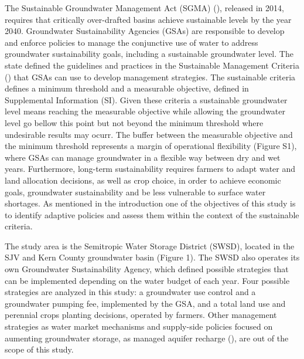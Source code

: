 \documentclass[11pt,a4paper]{article}
\begin{document}
 The Sustainable Groundwater Management Act (SGMA) (\cite{dwr_sustainable_2021}), released in 2014, requires that critically over-drafted basins achieve sustainable levels by the year 2040. Groundwater Sustainability Agencies (GSAs) are responsible to develop and enforce policies to manage the conjunctive use of water to address groundwater sustainability goals, including a sustainable groundwater level. The state defined the guidelines and practices in the Sustainable Management Criteria (\cite{dwr_sustainable_2017}) that GSAs can use to develop management strategies. The sustainable criteria defines a minimum threshold and a measurable objective, defined in Supplemental Information (SI). Given these criteria a sustainable groundwater level means reaching the measurable objective while allowing the groundwater level go bellow this point but not beyond the minimum threshold where undesirable results may ocurr. The buffer between the measurable objective and the minimum threshold represents a margin of operational flexibility (Figure S1), where GSAs can manage groundwater in a flexible way between dry and wet years. Furthermore, long-term sustainability requires farmers to adapt water and land allocation decisions, as well as crop choice, in order to achieve economic goals, groundwater sustainability and be less vulnerable to surface water shortages. As mentioned in the introduction one of the objectives of this study is to identify adaptive policies and assess them within the context of the sustainable criteria.
  
The study area is the Semitropic Water Storage District (SWSD), located in the SJV and Kern County groundwater basin (Figure 1). The SWSD also operates its own Groundwater Sustainability Agency, which defined possible strategies that can be implemented depending on the water budget of each year. Four possible strategies are analyzed in this study: a groundwater use control and a groundwater pumping fee, implemented by the GSA, and a total land use and perennial crops planting decisions, operated by farmers. Other management strategies as water market mechanisms and supply-side policies focused on aumenting groundwater storage, as managed aquifer recharge (\cite{ulibarri_assessing_2021}), are out of the scope of this study. 
\end{document}
